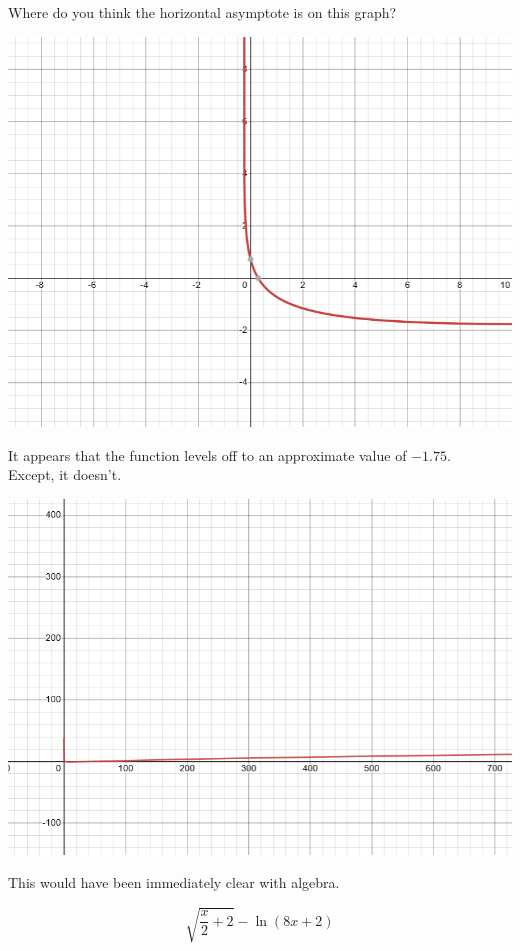 \documentclass{ximera}
\begin{document}
\begin{example}


Where do you think the horizontal asymptote is on this graph?

\begin{image}
\includegraphics{pics/graph_1A.png}
\end{image}

It appears that the function levels off to an approximate value of $-1.75$. \\


Except, it doesn't.

\begin{image}
\includegraphics{pics/graph_1B.png}
\end{image}

This would have been immediately clear with algebra.

\[  \sqrt{\frac{x}{2}+2} - \ln(8x+2)      \]


\end{example}
\end{document}
